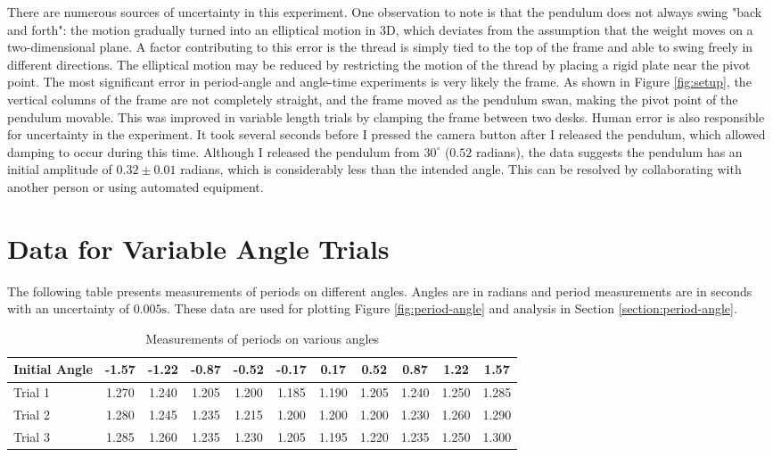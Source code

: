 \documentclass[12pt]{article}
\begin{document}
There are numerous sources of uncertainty in this experiment. One observation to note is that the pendulum does not always swing "back and forth": the motion gradually turned into an elliptical motion in 3D, which deviates from the assumption that the weight moves on a two-dimensional plane. A factor contributing to this error is the thread is simply tied to the top of the frame and able to swing freely in different directions. The elliptical motion may be reduced by restricting the motion of the thread by placing a rigid plate near the pivot point. The most significant error in period-angle and angle-time experiments is very likely the frame. As shown in Figure \ref{fig:setup}, the vertical columns of the frame are not completely straight, and the frame moved as the pendulum swan, making the pivot point of the pendulum movable. This was improved in variable length trials by clamping the frame between two desks. Human error is also responsible for uncertainty in the experiment. It took several seconds before I pressed the camera button after I released the pendulum, which allowed damping to occur during this time. Although I released the pendulum from $30^\circ$ ($0.52$ radians), the data suggests the pendulum has an initial amplitude of $0.32\pm0.01$ radians, which is considerably less than the intended angle. This can be resolved by collaborating with another person or using automated equipment.


\newpage




\newpage
\appendix


\section{Data for Variable Angle Trials} \label{appendix:period-angle}

The following table presents measurements of periods on different angles. Angles are in radians and period measurements are in seconds with an uncertainty of $0.005\mathrm{s}$. These data are used for plotting Figure {\ref{fig:period-angle}} and analysis in Section {\ref{section:period-angle}}.

\begin{table}[h]
\begin{tabularx}{\textwidth}{ |X|c|c|c|c|c|c|c|c|c|c| }
\hline
Initial Angle &
-1.57&-1.22&-0.87&-0.52&-0.17&0.17&0.52&0.87&1.22&1.57
\\ \hline
Trial 1 &
1.270&1.240&1.205&1.200&1.185&1.190&1.205&1.240&1.250&1.285
\\ \hline
Trial 2 &
1.280&1.245&1.235&1.215&1.200&1.200&1.200&1.230&1.260&1.290
\\ \hline
Trial 3 &
1.285&1.260&1.235&1.230&1.205&1.195&1.220&1.235&1.250&1.300
\\ \hline
\end{tabularx}
\caption{Measurements of periods on various angles}
\label{table:period-angle}
\end{table}
\end{document}
